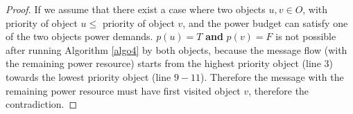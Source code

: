 \documentclass[../main/IoT.tex]{subfiles}
\begin{document}
\begin{proof}
    If we assume that there exist a case where two objects $u, v \in O$, with priority of object $u \le$ priority of object $v$, and the power budget can satisfy one of the two objects power demands. $p(u) = T$ \textbf{and} $p(v) = F$ is not possible after running Algorithm \ref{algo4} by both objects, because the message flow (with the remaining power resource) starts from the highest priority object (line $3$) towards the lowest priority object (line $9-11$). Therefore the message with the remaining power resource must have first visited object $v$, therefore the contradiction.
\end{proof}
\end{document}

